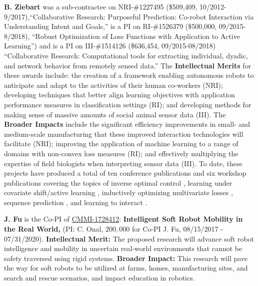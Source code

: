 \documentclass[letterpaper, 11 pt, onecolumn]{article}
\begin{document}
\noindent
\textbf{B. Ziebart} was a sub-contractee on NRI-\#1227495 (\$509,409,
10/2012-9/2017),``Collaborative Research:
Purposeful Prediction: Co-robot Interaction via Understanding Intent
and Goals,'' is a PI on RI-\#1526379 (\$500,000, 09/2015-8/2018),
``Robust Optimization of Loss Functions with Application to
Active Learning'') and is a PI on III-\#1514126 (\$636,454, 09/2015-08/2018)
``Collaborative Research: Computational tools for extracting individual,
dyadic, and network behavior from remotely sensed data.''
The {\bf Intellectual Merits} for these awards include: the
creation of a framework enabling autonomous robots to anticipate and adapt to the
activities of their human co-workers (NRI); developing techniques that
better align learning objectives with application performance measures
in classification settings (RI);
and developing methods for making sense of massive amounts of social animal
sensor data (III).
The {\bf Broader Impacts}
include the significant efficiency improvements in small- and
medium-scale manufacturing that these improved interaction technologies
will facilitate (NRI); improving the application of machine learning to a
range of domains with non-convex loss measures
(RI); and effectively multiplying the expertise
of field biologists when interpreting sensor data (III).
To date, these projects have produced
a total of ten conference publications and six workshop publications
covering the topics of
inverse optimal control \cite{asif2013inferring,monfort2013predictive,
byravan2014layered,monfort2015intent,chen2015predictive,
byravan2015graph,monfort2015softstar,chen2015imitation,chen2016adversarial},
learning under covariate shift/active learning
\cite{liu2014robust,liu2015shift,liu2015addressing,chen2016robust},
inductively optimizing multivariate losses \cite{wang2015adversarial},
sequence prediction \cite{li2016adversarial}, and learning to interact
\cite{behpour2015minimax}.

\noindent
\textbf{J. Fu} is the Co-PI of
\underline{CMMI-1728412}: \textbf{Intelligent Soft Robot Mobility in
  the Real World,} (PI: C. Onal, $200,000$ for Co-PI J. Fu, 08/15/2017
- 07/31/2020). \textbf{Intellectual Merit:} The proposed research will
advance soft robot intelligence and mobility in uncertain real-world
environments that cannot be safety traversed using rigid
systems.  \textbf{Broader Impact:} This research will pave the way for
soft robots to be utilized at farms, homes, manufacturing sites, and
search and rescue scenarios, and impact education in
robotics.
\end{document}
